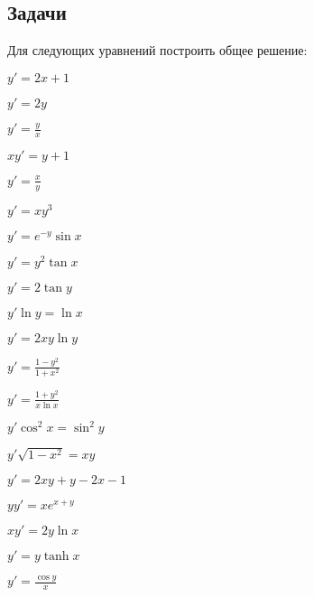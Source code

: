\subsection{Задачи}
	
	Для следующих уравнений построить общее решение:
	\begin{multicols}{3}
		\begin{enumtasks}

			\label{firstorder:separable}
			\item \( y' = 2x + 1 \)															%
			\item \( y' = 2y \)																%
			\item \( y' = \frac{y}{x} \)													%
			\item \( xy' = y + 1 \)															%
			\item \( y' = \frac{x}{y} \)													%
			\item \( y' = xy^3 \)															%
			\item \( y' = e^{-y} \sin{x} \)													%
			\item \( y' = y^2 \tan{x} \)													%
			\item \( y' = 2\tan{y} \)														%
			\item \( y' \ln{y} = \ln{x} \)													%
			\item \( y' = 2x y \ln{y} \)													%
			\item \( y' = \frac{1 - y^2}{1 + x^2} \)										%
			\item \( y' = \frac{1 + y^2}{x \ln{x}} \)										%
			\item \( y' \cos^2{x} = \sin^2{y} \)											%
			\item \( y' \sqrt{1 - x^2} = xy \)												%
			\item \( y' = 2xy + y - 2x - 1 \)												%
			\item \( yy' = xe^{x + y} \)													%
			\item \( xy' = 2y\ln{x} \)														%
			\item \( y' = y \tanh{x} \)														%
			\item \( y' = \frac{\cos{y}}{x} \)												%

\end{enumtasks}
\end{multicols}
